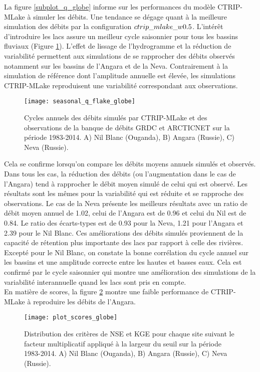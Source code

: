 La figure \ref{subplot_q_globe} informe sur les performances du modèle CTRIP-MLake à simuler les débits. Une tendance se dégage quant à la meilleure simulation des débits par la configuration $\small{ctrip\_mlake\_w0.5}$. L'intérêt d'introduire les lacs assure un meilleur cycle saisonnier pour tous les bassins fluviaux (Figure \ref{seasonal_q_globe}). L'effet de lissage de l'hydrogramme et la réduction de variabilité permettent aux simulations de se rapprocher des débits observés notamment sur les bassins de l'Angara et de la Neva. Contrairement à la simulation de référence dont l'amplitude annuelle est élevée, les simulations CTRIP-MLake reproduisent une variabilité correspondant aux observations.\\

\begin{figure}[h!]
\texttt{[image: seasonal\_q\_flake\_globe]}
\caption{Cycles annuels des débits simulés par CTRIP-MLake et des observations de la banque de débits GRDC et ARCTICNET sur la période 1983-2014. A) Nil Blanc (Ouganda), B) Angara (Russie), C) Neva (Russie).}
\label{seasonal_q_globe}
\end{figure}

Cela se confirme lorsqu'on compare les débits moyens annuels simulés et observés. Dans tous les cas, la réduction des débits (ou l'augmentation dans le cas de l'Angara) tend à rapprocher le débit moyen simulé de celui qui est observé. Les résultats sont les mêmes pour la variabilité qui est réduite et se rapproche des observations. Le cas de la Neva présente les meilleurs résultats avec un ratio de débit moyen annuel de 1.02, celui de l'Angara est de 0.96 et celui du Nil est de 0.84. Le ratio des écarts-types est de 0.93 pour la Neva, 1.21 pour l'Angara et 2.39 pour le Nil Blanc. Ces améliorations des débits simulés proviennent de la capacité de rétention plus importante des lacs par rapport à celle des rivières.
Excepté pour le Nil Blanc, on constate la bonne corrélation du cycle annuel sur les bassins et une amplitude correcte entre les hautes et basses eaux. Cela est confirmé par le cycle saisonnier qui montre une amélioration des simulations de la variabilité interannuelle quand les lacs sont pris en compte.\\
\clearpage
En matière de scores, la figure \ref{plot_scores_globe} montre une faible performance de CTRIP-MLake à reproduire les débits de l'Angara. 

\begin{figure}[h!]
\texttt{[image: plot\_scores\_globe]}
\caption{Distribution des critères de NSE et KGE pour chaque site suivant le facteur multiplicatif appliqué à la largeur du seuil sur la période 1983-2014. A) Nil Blanc (Ouganda), B) Angara (Russie), C) Neva (Russie).}
\label{plot_scores_globe}
\end{figure}

